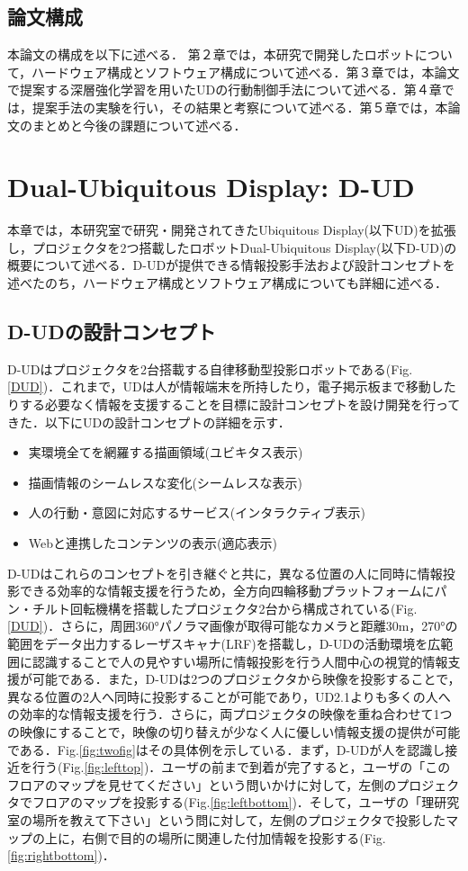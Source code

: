 \documentclass[12pt]{sonota/aislab}
\begin{document}
\section{論文構成}
本論文の構成を以下に述べる．
第２章では，本研究で開発したロボットについて，ハードウェア構成とソフトウェア構成について述べる．第３章では，本論文で提案する深層強化学習を用いたUDの行動制御手法について述べる．第４章では，提案手法の実験を行い，その結果と考察について述べる．第５章では，本論文のまとめと今後の課題について述べる．


\chapter{Dual-Ubiquitous Display: D-UD}\label{chap:d_ud_mechanism}
本章では，本研究室で研究・開発されてきたUbiquitous Display(以下UD)を拡張し，プロジェクタを2つ搭載したロボットDual-Ubiquitous Display(以下D-UD)の概要について述べる．D-UDが提供できる情報投影手法および設計コンセプトを述べたのち，ハードウェア構成とソフトウェア構成についても詳細に述べる．

\section{D-UDの設計コンセプト}
D-UDはプロジェクタを2台搭載する自律移動型投影ロボットである(Fig.\ref{DUD})．これまで，UDは人が情報端末を所持したり，電子掲示板まで移動したりする必要なく情報を支援することを目標に設計コンセプトを設け開発を行ってきた\cite{UD1}．以下にUDの設計コンセプトの詳細を示す．

\begin{itemize}
\item 実環境全てを網羅する描画領域(ユビキタス表示)
\item 描画情報のシームレスな変化(シームレスな表示)
\item 人の行動・意図に対応するサービス(インタラクティブ表示)
\item Webと連携したコンテンツの表示(適応表示)
\end{itemize}

D-UDはこれらのコンセプトを引き継ぐと共に，異なる位置の人に同時に情報投影できる効率的な情報支援を行うため，全方向四輪移動プラットフォームにパン・チルト回転機構を搭載したプロジェクタ2台から構成されている(Fig.\ref{DUD})．さらに，周囲360°パノラマ画像が取得可能なカメラと距離30m，270°の範囲をデータ出力するレーザスキャナ(LRF)を搭載し，D-UDの活動環境を広範囲に認識することで人の見やすい場所に情報投影を行う人間中心の視覚的情報支援が可能である．また，D-UDは2つのプロジェクタから映像を投影することで，異なる位置の2人へ同時に投影することが可能であり，UD2.1よりも多くの人への効率的な情報支援を行う．さらに，両プロジェクタの映像を重ね合わせて1つの映像にすることで，映像の切り替えが少なく人に優しい情報支援の提供が可能である．Fig.\ref{fig:twofig}はその具体例を示している．まず，D-UDが人を認識し接近を行う(Fig.\ref{fig:lefttop})．ユーザの前まで到着が完了すると，ユーザの「このフロアのマップを見せてください」という問いかけに対して，左側のプロジェクタでフロアのマップを投影する(Fig.\ref{fig:leftbottom})．そして，ユーザの「理研究室の場所を教えて下さい」という問に対して，左側のプロジェクタで投影したマップの上に，右側で目的の場所に関連した付加情報を投影する(Fig.\ref{fig:rightbottom})．
\end{document}
